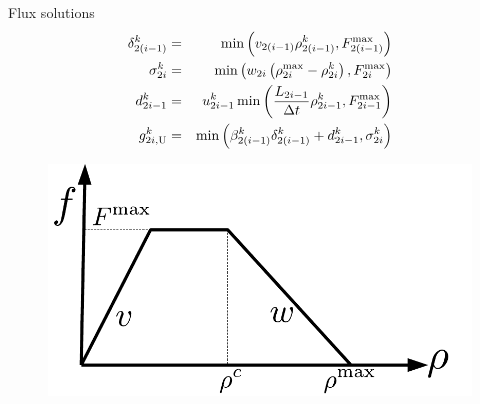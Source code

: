 \begin{frame}{Flux solutions}
\begin{eqnarray}
\delta_{2\left(i-1\right)}^{k} & = & \min\left(v_{2\left(i-1\right)}\rho_{2\left(i-1\right)}^{k},F_{2\left(i-1\right)}^{\max}\right)\label{eq:first-ramp}\\
\sigma_{2i}^{k} & = & \min\left(w_{2i}\left(\rho_{2i}^{\max}-\rho_{2i}^{k}\right),F_{2i}^{\max}\right)\label{eq:supply}\\
d_{2i-1}^{k} & = & u_{2i-1}^{k}\min\left(\frac{L_{2i-1}}{\Delta t}\rho_{2i-1}^{k},F_{2i-1}^{\max}\right)\label{eq:ramp-eqn}\\
g_{2i,\text{U}}^{k} & = & \min\left(\beta_{2\left(i-1\right)}^{k}\delta_{2\left(i-1\right)}^{k}+d_{2i-1}^{k},\sigma_{2i}^{k}\right)\label{eq:fin}
\end{eqnarray}

\begin{figure}
\begin{centering}
\includegraphics[width=0.4\columnwidth]{../figs-gen/fd}
\par\end{centering}
\end{figure}

\end{frame}


